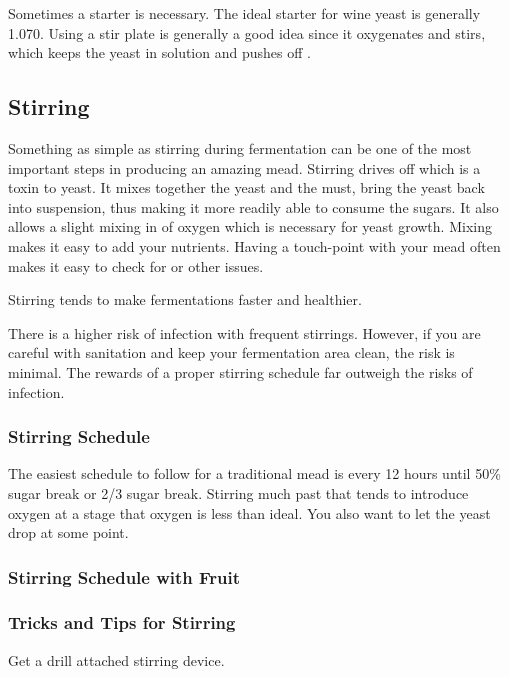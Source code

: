 \documentclass{article}
\begin{document}
  Sometimes a starter is necessary. The ideal starter for wine yeast is generally 1.070. Using a stir plate is generally a good idea since it oxygenates and stirs,
  which keeps the yeast in solution and pushes off .

 \subsection{Stirring}
  Something as simple as stirring during fermentation can be one of the most important steps in producing an amazing mead. Stirring drives off  which is a 
  toxin to yeast. It mixes together the yeast and the must, bring the yeast back into suspension, thus making it more readily able to consume the sugars. It also
  allows a slight mixing in of oxygen which is necessary for yeast growth. Mixing makes it easy to add your nutrients. Having a touch-point with your mead often
  makes it easy to check for  or other issues.

  Stirring tends to make fermentations faster and healthier. 

  There is a higher risk of infection with frequent stirrings. However, if you are careful with sanitation and keep your fermentation area clean, the risk is minimal.
  The rewards of a proper stirring schedule far outweigh the risks of infection.

  \subsubsection{Stirring Schedule}
   The easiest schedule to follow for a traditional mead is every 12 hours until 50\% sugar break or 2/3 sugar break. Stirring much past that tends to introduce
   oxygen at a stage that oxygen is less than ideal. You also want to let the yeast drop at some point.

  \subsubsection{Stirring Schedule with Fruit}

  \subsubsection{Tricks and Tips for Stirring}
   Get a drill attached stirring device.
\end{document}
